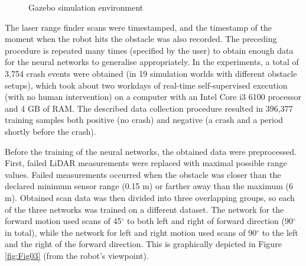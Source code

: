\begin{figure}
    \centering
    \vfill
    \caption{Gazebo simulation environment}
    \label{fig:Fig02}
\end{figure}

The laser range finder scans were timestamped, and the timestamp of the moment when the robot hits the obstacle was also recorded. The preceding procedure is repeated many times (specified by the user) to obtain enough data for the neural networks to generalise appropriately. In the experiments, a total of 3,754 crash events were obtained (in 19 simulation worlds with different obstacle setups), which took about two workdays of real-time self-supervised execution (with no human intervention) on a computer with an Intel Core i3 6100 processor and 4 GB of RAM. The described data collection procedure resulted in 396,377 training samples both positive (no crash) and negative (a crash and a period shortly before the crash).

Before the training of the neural networks, the obtained data were preprocessed. First, failed LiDAR measurements were replaced with maximal possible range values. Failed measurements occurred when the obstacle was closer than the declared minimum sensor range (0.15 m) or farther away than the maximum (6 m). Obtained scan data was then divided into three overlapping groups, so each of the three networks was trained on a different dataset. The network for the forward motion used scans of 45$^{\circ}$ to both left and right of forward direction (90$^{\circ}$ in total), while the network for left and right motion used scans of 90$^{\circ}$ to the left and the right of the forward direction. This is graphically depicted in Figure \ref{fig:Fig03} (from the robot's viewpoint).

